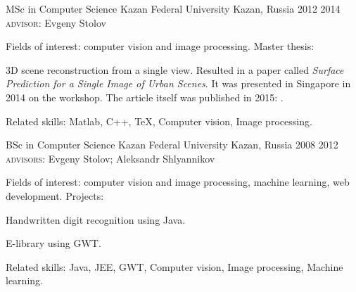

\begin{cventries}

  \cveducation
    {MSc in Computer Science} %
    {Kazan Federal University} %
    {Kazan, Russia} %
    {2012 \textemdash{} 2014} %
    {\textsc{advisor}: Evgeny Stolov}
    {
    Fields of interest: computer vision and image processing. Master thesis:
      \begin{cvitems} %
      \item{3D scene reconstruction from a single view. Resulted in a paper called \textit{Surface Prediction for a Single Image of Urban Scenes}. It was presented in Singapore in 2014 on the  workshop. The article itself was published in 2015: .}
      \end{cvitems}
      Related skills: Matlab, C++, \TeX, Computer vision, Image processing.
    }
    
  \cveducation
    {BSc in Computer Science} %
    {Kazan Federal University} %
    {Kazan, Russia} %
    {2008 \textemdash{} 2012} %
    {\textsc{advisors}: Evgeny Stolov; Aleksandr Shlyannikov}
    {
    Fields of interest: computer vision and image processing, machine learning, web development. Projects: 
      \begin{cvitems} %
      \item{Handwritten digit recognition using Java.}
      \item{E-library using GWT.}
      \end{cvitems}
      Related skills: Java, JEE, GWT, Computer vision, Image processing, Machine learning.
    }

\end{cventries}
